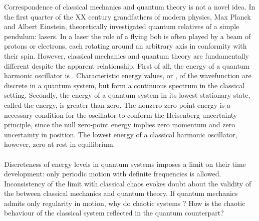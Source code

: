 Correspondence of classical mechanics and quantum theory is not a novel idea. In the first quarter of the XX century grandfathers of modern physics, Max Planck and Albert Einstein, theoretically investigated quantum relatives of a simple pendulum: lasers.\cites{1900a}{1900b}{ein} In a laser the role of a flying bob is often played by a beam of protons or electrons, each rotating around an arbitrary axis in conformity with their spin. However, classical mechanics and quantum theory are fundamentally different despite the apparent relationship.\cite{qm1} First of all, the energy of a quantum harmonic oscillator is . Characteristic energy values, or , of the wavefunction are discrete in a quantum system, but form a continuous spectrum in the classical setting. Secondly, the energy of a quantum system in its lowest stationary state, called the  energy, is greater than zero. The nonzero zero-point energy is a necessary condition for the oscillator to conform the Heisenberg uncertainty principle, since the null zero-point energy implies zero momentum and zero uncertainty in position.\cite{uni} The lowest energy of a classical harmonic oscillator, however,  zero at rest in equilibrium.\\\\Discreteness of energy levels in quantum systems imposes a limit on their time development: only periodic motion with definite frequencies is allowed. Inconsistency of the limit with classical chaos evokes doubt about the validity of the  between classical mechanics and quantum theory.\cite{berry358} If quantum mechanics admits only regularity in motion, why do chaotic systems ? How is the chaotic behaviour of the classical system reflected in the quantum counterpart?
%

